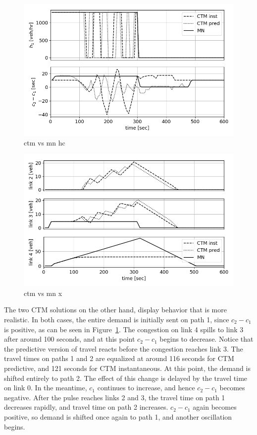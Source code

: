 \begin{figure}[h]
    \centering
    \includegraphics[width=\linewidth]{figs/ctm_vs_mn_hc.png}
    \caption{ctm vs mn hc}
    \label{fig:ctm_vs_mn_hc}
\end{figure}

\begin{figure}[h]
    \centering
    \includegraphics[width=\linewidth]{figs/ctm_vs_mn_x.png}
    \caption{ctm vs mn x}
    \label{fig:ctm_vs_mn_x}
\end{figure}
The two CTM solutions on the other hand, display behavior that is more realistic. In both cases, the entire demand is initially sent on path 1, since $c_2-c_1$ is positive, as can be seen in Figure~\ref{fig:ctm_vs_mn_hc}. The congestion on link 4 spills to link 3 after around 100 seconds, and at this point $c_2-c_1$ begins to decrease. Notice that the predictive version of travel reacts before the congestion reaches link 3. The travel times on paths 1 and 2 are equalized at around 116 seconds for CTM predictive, and 121 seconds for CTM instantaneous. At this point, the demand is shifted entirely to path 2. The effect of this change is delayed by the travel time on link 0. In the meantime, $c_1$ continues to increase, and hence $c_2-c_1$ becomes negative. After the pulse reaches links 2 and 3, the travel time on path 1 decreases rapidly, and travel time on path 2 increases. $c_2-c_1$ again becomes positive, so demand is shifted once again to path 1, and another oscillation begins. 

